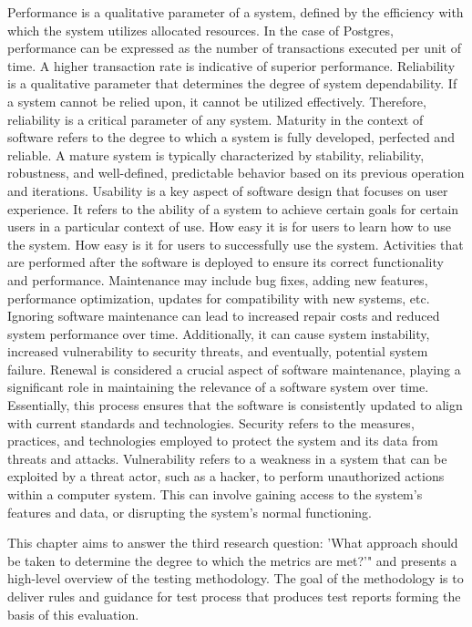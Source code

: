 Performance is a qualitative parameter of a system, defined by the efficiency with which the system utilizes allocated resources. In the case of Postgres, performance can be expressed as the number of transactions executed per unit of time. A higher transaction rate is indicative of superior performance.
Reliability is a qualitative parameter that determines the degree of system dependability. If a system cannot be relied upon, it cannot be utilized effectively. Therefore, reliability is a critical parameter of any system.
Maturity in the context of software refers to the degree to which a system is fully developed, perfected and reliable. A mature system is typically characterized by stability, reliability, robustness, and well-defined, predictable behavior based on its previous operation and iterations.
Usability is a key aspect of software design that focuses on user experience. It refers to the ability of a system to achieve certain goals for certain users in a particular context of use.
How easy it is for users to learn how to use the system.
How easy is it for users to successfully use the system.
Activities that are performed after the software is deployed to ensure its correct functionality and performance. Maintenance may include bug fixes, adding new features, performance optimization, updates for compatibility with new systems, etc. Ignoring software maintenance can lead to increased repair costs and reduced system performance over time. Additionally, it can cause system instability, increased vulnerability to security threats, and eventually, potential system failure.
Renewal is considered a crucial aspect of software maintenance, playing a significant role in maintaining the relevance of a software system over time. Essentially, this process ensures that the software is consistently updated to align with current standards and technologies.
Security refers to the measures, practices, and technologies employed to protect the system and its data from threats and attacks.
Vulnerability refers to a weakness in a system that can be exploited by a threat actor, such as a hacker, to perform unauthorized actions within a computer system. This can involve gaining access to the system's features and data, or disrupting the system's normal functioning.


This chapter aims to answer the third research question: 'What approach should be taken to determine the degree to which the metrics are
met?'" and presents a high-level overview of the testing methodology. The goal of the methodology is to deliver rules and guidance for test process that produces test reports forming the basis of this evaluation.

